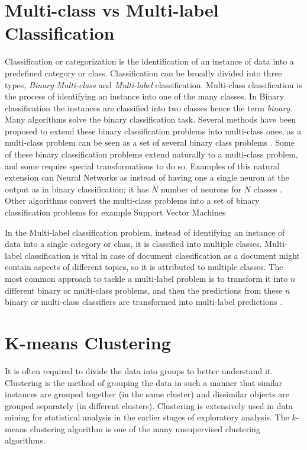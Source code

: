 \section{Multi-class vs Multi-label Classification}
Classification or categorization is the identification of an instance of data into a predefined category or class. Classification can be broadly divided into three types, \textit{Binary} \textit{Multi-class} and \textit{Multi-label} classification. Multi-class classification is the process of identifying an instance into one of the many classes. In Binary classification the instances are classified into two classes hence the term \textit{binary}. Many algorithms solve the binary classification task. Several methods have been proposed to extend these binary classification problems into multi-class ones, as a multi-class problem can be seen as a set of several binary class problems \cite{aly2005survey}. Some of these binary classification problems extend naturally to a multi-class problem, and some require special transformations to do so. Examples of this natural extension can Neural Networks as instead of having one a single neuron at the output as in binary classification; it has $N$ number of neurons for $N$ classes  \cite{bishop1995neural}. Other algorithms convert the multi-class problems into a set of binary classification problems for example Support Vector Machines \cite{cortes1995support}

In the Multi-label classification problem, instead of identifying an instance of data into a single category or class, it is classified into multiple classes. Multi-label classification is vital in case of document classification as a document might contain aspects of different topics, so it is attributed to multiple classes. The most common approach to tackle a multi-label problem is to transform it into $n$ different binary or multi-class problems, and then the predictions from these $n$ binary or multi-class classifiers are transformed into multi-label predictions \cite{read2011classifier}.

\section{K-means Clustering}
It is often required to divide the data into groups to better understand it. Clustering is the method of grouping the data in such a manner that similar instances are grouped together (in the same cluster) and dissimilar objects are grouped separately (in different clusters). Clustering is extensively used in data mining for statistical analysis in the earlier stages of exploratory analysis. The $k$-means clustering algorithm is one of the many unsupervised clustering algorithms.

